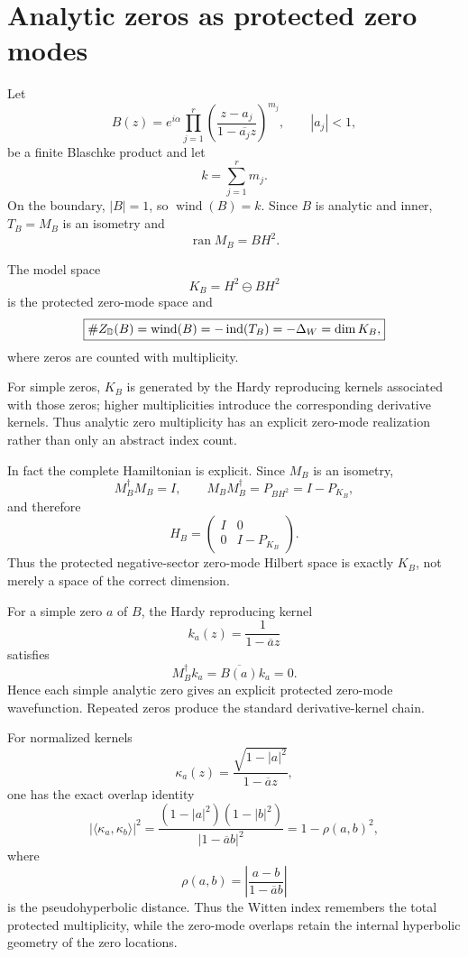 \section{Analytic zeros as protected zero modes}

Let
\[
B(z)
=
e^{i\alpha}
\prod_{j=1}^{r}
\left(
\frac{z-a_j}{1-\overline{a_j}z}
\right)^{m_j},
\qquad
|a_j|<1,
\]
be a finite Blaschke product and let
\[
k=\sum_{j=1}^r m_j.
\]
On the boundary, $|B|=1$, so $\operatorname{wind}(B)=k$. Since $B$ is analytic and inner, $T_B=M_B$ is an isometry and
\[
\operatorname{ran}M_B=BH^2.
\]

\begin{corollary}\label{cor:blaschke}
The model space
\[
K_B=H^2\ominus BH^2
\]
is the protected zero-mode space and
\[
\boxed{
\# Z_{\mathbb D}(B)
=
\operatorname{wind}(B)
=
-\operatorname{ind}(T_B)
=
-\Delta_W
=
\dim K_B,
}
\]
where zeros are counted with multiplicity.
\end{corollary}

For simple zeros, $K_B$ is generated by the Hardy reproducing kernels associated with those zeros; higher multiplicities introduce the corresponding derivative kernels. Thus analytic zero multiplicity has an explicit zero-mode realization rather than only an abstract index count.

In fact the complete Hamiltonian is explicit. Since $M_B$ is an isometry,
\[
M_B^\dagger M_B=I,
\qquad
M_BM_B^\dagger=P_{BH^2}=I-P_{K_B},
\]
and therefore
\[
\boxed{
H_B=
\begin{pmatrix}
I&0\\
0&I-P_{K_B}
\end{pmatrix}.
}
\]
Thus the protected negative-sector zero-mode Hilbert space is exactly $K_B$, not merely a space of the correct dimension.

For a simple zero $a$ of $B$, the Hardy reproducing kernel
\[
k_a(z)=\frac{1}{1-\overline a z}
\]
satisfies
\[
M_B^\dagger k_a
=
\overline{B(a)}k_a
=
0.
\]
Hence each simple analytic zero gives an explicit protected zero-mode wavefunction. Repeated zeros produce the standard derivative-kernel chain.

For normalized kernels
\[
\kappa_a(z)=\frac{\sqrt{1-|a|^2}}{1-\overline a z},
\]
one has the exact overlap identity
\[
\boxed{
|\langle\kappa_a,\kappa_b\rangle|^2
=
\frac{(1-|a|^2)(1-|b|^2)}{|1-\overline a b|^2}
=
1-\rho(a,b)^2,
}
\]
where
\[
\rho(a,b)
=
\left|\frac{a-b}{1-\overline a b}\right|
\]
is the pseudohyperbolic distance. Thus the Witten index remembers the total protected multiplicity, while the zero-mode overlaps retain the internal hyperbolic geometry of the zero locations.

